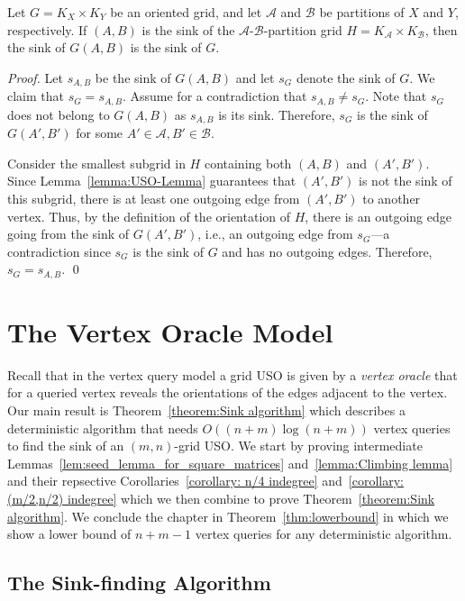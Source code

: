 \documentclass[runningheads,a4paper]{llncs}
\newcommand{\A}{\ensuremath{\mathcal A}}
\newcommand{\B}{\ensuremath{\mathcal B}}
\newcommand{\s}[1]{\ensuremath{s_{\scriptscriptstyle#1}}}
\begin{document}
\begin{theorem}
\label{thm:the_sink_of_the_sink_of_the_induced_orientation_is_the_global_sink}

Let $G = K_X \times K_Y$ be an oriented grid,
and let $\A$ and $\B$ be partitions of $X$ and $Y$, respectively.
If $(A,B)$ is the sink of the $\A$-$\B$-partition grid $H = K_\A \times K_\B$, then the sink of $G(A,B)$ is the sink of $G$.
\end{theorem}
\begin{proof}
Let $\s{A,B}$ be the sink of $G(A,B)$ and let $\s{G}$ denote the sink of $G$.
We claim that $\s{G} = \s{A,B}$.
Assume for a contradiction that $\s{A,B}\neq \s{G}$.
Note that $\s{G}$ does not belong to $G(A,B)$ as $\s{A,B}$ is its sink.
Therefore, $\s{G}$ is the sink of $G(A', B')$ for some $A'\in \A, B'\in \B$.

Consider the smallest subgrid in $H$ containing both $(A,B)$ and $(A', B')$. 
Since Lemma~\ref{lemma:USO-Lemma} guarantees that $(A',B')$ is not the sink of this subgrid, there is at least one outgoing edge from $(A',B')$ to another vertex.
Thus, by the definition of the orientation of $H$, there is an outgoing edge going from the sink of $G(A',B')$, i.e., an outgoing edge from $\s{G}$---a contradiction since $\s{G}$ is the sink of $G$ and has no outgoing edges. 
Therefore, $\s{G} = \s{A,B}$. \qed
\end{proof}


\section{The Vertex Oracle Model}
\label{section:The vertex oracle model}

Recall that in the vertex query model a grid USO is given by a \emph{vertex oracle} that for a queried vertex reveals the orientations of the edges adjacent to the vertex. Our main result is Theorem~\ref{theorem:Sink algorithm} which describes a deterministic algorithm that needs $O((n + m) \log (n + m))$ vertex queries to find the sink of an $(m, n)$-grid USO. We start by proving intermediate Lemmas~\ref{lem:seed_lemma_for_square_matrices} and~\ref{lemma:Climbing lemma} and their repsective Corollaries~\ref{corollary: n/4 indegree} and~\ref{corollary: (m/2,n/2) indegree} which we then combine to prove Theorem~\ref{theorem:Sink algorithm}. We conclude the chapter in Theorem~\ref{thm:lowerbound} in which we show a lower bound of $n+m-1$ vertex queries for any deterministic algorithm.

\subsection{The Sink-finding Algorithm}
\label{section:the_sink_finding_algorithm}
\end{document}
